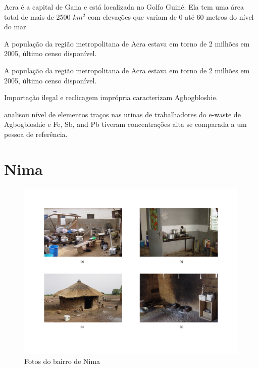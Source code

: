 Acra é a capital  de Gana e está localizada no Golfo Guiné. Ela tem uma área 
total de mais de 2500 $km^2$ com elevações que variam de 0 até 60 metros do nível 
do mar. 

A população da região metropolitana de Acra estava em torno de 2 milhões em 2005, 
último censo disponível.


A população da região metropolitana de Acra estava em torno de 2 milhões em 2005, 
último censo disponível.

Importação ilegal e reclicagem imprópria caracterizam Agbogbloshie.

\cite{asante2012} analisou nível de elementos traços nas urinas de trabalhadores 
do e-waste de Agbogbloshie e Fe, Sb, and Pb tiveram concentrações alta se comparada
a um pessoa de referência. 


\section{Nima}

\begin{figure}[H]
  \caption{Fotos do bairro de Nima}
  \includegraphics[scale=0.35]{../inputs/images/zheng/nima.pdf}
\end{figure}


